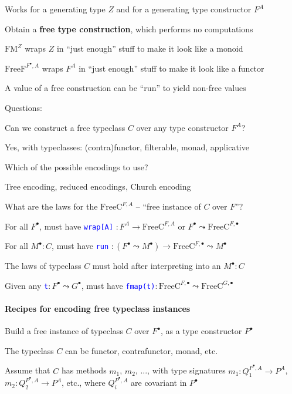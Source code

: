 Works for a generating type $Z$ and for a generating type constructor
$F^{A}$

Obtain a \textbf{free type construction}, which performs no computations

$\text{FM}^{Z}$ wraps $Z$ in \textsf{``}just enough\textsf{''} stuff to make it
look like a monoid

$\text{FreeF}^{F^{\bullet},A}$ wraps $F^{A}$ in \textsf{``}just enough\textsf{''}
stuff to make it look like a functor

A value of a free construction can be \textsf{``}run\textsf{''} to yield non-free
values 

Questions:

Can we construct a free typeclass $C$ over any type constructor $F^{A}$?

Yes, with typeclasses: (contra)functor, filterable, monad, applicative

Which of the possible encodings to use?

Tree encoding, reduced encodings, Church encoding

What are the laws for the{\footnotesize{} $\text{FreeC}^{F,A}$} –
\textsf{``}free instance of $C$ over $F$\textsf{''}?

For all $F^{\bullet}$, must have \texttt{\textcolor{blue}{\footnotesize{}wrap{[}A{]}}}
$:F^{A}\rightarrow\text{FreeC}^{F,A}$ or $F^{\bullet}\leadsto\text{FreeC}^{F,\bullet}$

For all $M^{\bullet}:C$, must have \texttt{\textcolor{blue}{\footnotesize{}run}}
$:\left(F^{\bullet}\leadsto M^{\bullet}\right)\rightarrow\text{FreeC}^{F,\bullet}\leadsto M^{\bullet}$

The laws of typeclass $C$ must hold after interpreting into an $M^{\bullet}:C$

Given any \texttt{\textcolor{blue}{\footnotesize{}t}}$:F^{\bullet}\leadsto G^{\bullet}$,
must have \texttt{\textcolor{blue}{\footnotesize{}fmap(t)}}$:\text{FreeC}^{F,\bullet}\leadsto\text{FreeC}^{G,\bullet}$


\paragraph{Recipes for encoding free typeclass instances}

Build a free instance of typeclass $C$ over $F^{\bullet}$, as a
type constructor $P^{\bullet}$ 

The typeclass $C$ can be functor, contrafunctor, monad, etc.

Assume that $C$ has methods $m_{1}$, $m_{2}$, ..., with type signatures
{\footnotesize{}$m_{1}:Q_{1}^{P^{\bullet},A}\rightarrow P^{A}$},
{\footnotesize{}$m_{2}:Q_{2}^{P^{\bullet},A}\rightarrow P^{A}$},
etc., where $Q_{i}^{P^{\bullet},A}$ are covariant in $P^{\bullet}$ 


